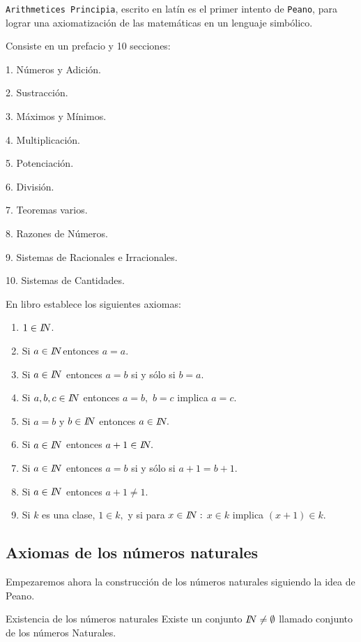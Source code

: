 \texttt{Arithmetices Principia}, escrito en latín es el primer intento
de \texttt{Peano}, para lograr una axiomatización de las matemáticas
en un lenguaje simbólico. 

Consiste en un prefacio y 10 secciones:

1. Números y Adición.

2. Sustracción.

3. Máximos y Mínimos. 

4. Multiplicación.

5. Potenciación. 

6. División.

7. Teoremas varios.

8. Razones de Números.

9. Sistemas de Racionales e Irracionales.

10. Sistemas de Cantidades.

En libro establece los siguientes axiomas:
\begin{enumerate}
\item $1\in\na$.
\item Si $a\in\na$entonces $a=a.$
\item Si $a\in\na$ entonces $a=b$ si y sólo si $b=a.$
\item Si $a,b,c\in\na$ entonces $a=b,$ $b=c$ implica $a=c.$
\item Si $a=b$ y $b\in\na$ entonces $a\in\na.$
\item Si $a\in\na$ entonces $a+1\in\na.$
\item Si $a\in\na$ entonces $a=b$ si y sólo si $a+1=b+1$.
\item Si $a\in\na$ entonces $a+1\neq1.$
\item Si $k$ es una clase, $1\in k,$ y si para $x\in\na:$ $x\in k$ implica
$\left(x+1\right)\in k$.
\end{enumerate}

\subsection{Axiomas de los números naturales}

Empezaremos ahora la construcción de los números naturales siguiendo
la idea de Peano.\medskip{}
\medskip{}

\begin{axioma}{Existencia de los números naturales\label{ap1}}  
Existe un conjunto $\na\neq\emptyset$ llamado conjunto de los números
Naturales.

\end{axioma}

